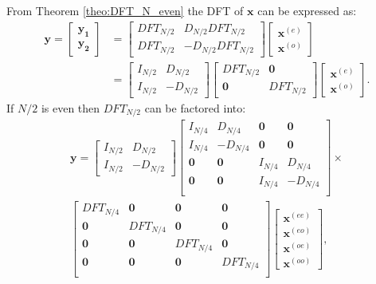 From Theorem \ref{theo:DFT_N_even} the DFT of $\textbf{x}$ can be expressed as: 
\begin{align*}
    \mathbf{y}=
    \begin{bmatrix}
        \mathbf{y_1}\\
        \mathbf{y_2}
    \end{bmatrix}
    &=
    \begin{bmatrix}
        DFT_{N/2} & D_{N/2}DFT_{N/2} \\
        DFT_{N/2} & -D_{N/2}DFT_{N/2}
    \end{bmatrix}
    \begin{bmatrix}
        \mathbf{x}^{(e)} \\
        \mathbf{x}^{(o)}
    \end{bmatrix}\\
    &=
    \begin{bmatrix}
        I_{N/2} & D_{N/2} \\
        I_{N/2} & -D_{N/2}
    \end{bmatrix}
    \begin{bmatrix}
        DFT_{N/2} & \mathbf{0} \\
        \mathbf{0} & DFT_{N/2}
    \end{bmatrix}
    \begin{bmatrix}
        \mathbf{x}^{(e)} \\
        \mathbf{x}^{(o)}
    \end{bmatrix}.
\end{align*}
If $N/2$ is even then $DFT_{N/2}$ can be factored into:
\begin{align*}
        \mathbf{y}=
    \begin{bmatrix}
        I_{N/2} & D_{N/2} \\
        I_{N/2} & -D_{N/2}
    \end{bmatrix}
    \begin{bmatrix}
        I_{N/4} & D_{N/4} & \mathbf{0} & \mathbf{0} \\
        I_{N/4} & -D_{N/4} & \mathbf{0} & \mathbf{0} \\
        \mathbf{0} & \mathbf{0} & I_{N/4} & D_{N/4}  \\
        \mathbf{0} & \mathbf{0} & I_{N/4} & -D_{N/4} \\
    \end{bmatrix}\times\\
    \begin{bmatrix}
        DFT_{N/4} & \mathbf{0} & \mathbf{0} & \mathbf{0} \\
        \mathbf{0} & DFT_{N/4} & \mathbf{0} & \mathbf{0} \\
        \mathbf{0} & \mathbf{0} & DFT_{N/4} & \mathbf{0} \\
        \mathbf{0} & \mathbf{0} & \mathbf{0} & DFT_{N/4} \\
    \end{bmatrix}
    \begin{bmatrix}
        \mathbf{x}^{(ee)} \\
        \mathbf{x}^{(eo)} \\
        \mathbf{x}^{(oe)} \\
        \mathbf{x}^{(oo)}
    \end{bmatrix},
\end{align*}
